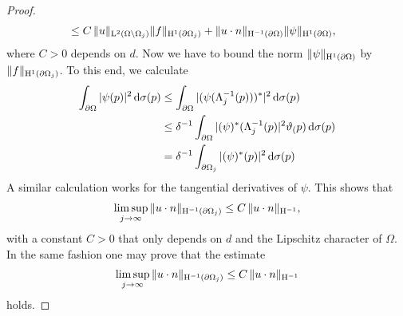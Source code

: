 \begin{proof}
\begin{align*}
    &\leq C\, \|u\|_{\mathrm{L}^2(\Omega \setminus \Omega_j)} \|f\|_{\mathrm{H}^1(\partial\Omega_j)} + \|u \cdot n\|_{\mathrm{H}^{-1}(\partial\Omega)} \|\psi\|_{\mathrm{H}^1(\partial\Omega)},
  \end{align*}
  where $C > 0$ depends on $d$.
  Now we have to bound the norm $\|\psi\|_{\mathrm{H}^1(\partial\Omega)}$ by $\|f\|_{\mathrm{H}^1(\partial\Omega_j)}$.
  To this end, we calculate
  \begin{align*}
    \int_{\partial\Omega} |\psi(p)|^2 \, {\operatorname{d}\!{\sigma}}(p)
    &\leq \int_{\partial\Omega} |(\psi(\Lambda_j^{-1}(p)))^*|^2 \, {\operatorname{d}\!{\sigma}}(p) \\
    &\leq \delta^{-1} \int_{\partial\Omega} | (\psi)^*(\Lambda_j^{-1}(p)|^2 \vartheta_(p) \, {\operatorname{d}\!{\sigma}}(p) \\
    &= \delta^{-1} \int_{\partial\Omega_j} |(\psi)^*(p)|^2 \, {\operatorname{d}\!{\sigma}}(p) 
  \end{align*}
  A similar calculation works for the tangential derivatives of $\psi$.
  This shows that
  \begin{align*}
    \limsup_{j \to \infty} \|u \cdot n\|_{\mathrm{H}^{-1}(\partial\Omega_j)} \leq C \, \|u \cdot n\|_{\mathrm{H}^{-1}},
  \end{align*}
  with a constant $C > 0$ that only depends on $d$ and the Lipschitz character of $\Omega$.
  In the same fashion one may prove that the estimate
  \begin{align*}
    \limsup_{j \to \infty} \|u \cdot n\|_{\mathrm{H}^{-1}(\partial\Omega_j)} \leq C \, \|u \cdot n\|_{\mathrm{H}^{-1}}
  \end{align*}
  holds.


\end{proof}
